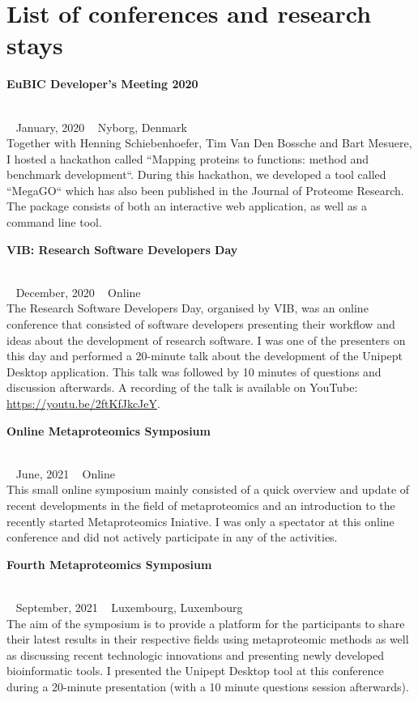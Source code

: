 \chapter*{List of conferences and research stays}

\begin{large}\textbf{\textsf{EuBIC Developer's Meeting 2020}}\end{large} \\
\faCalendar ~ \textsf{January, 2020} \hfill \faGlobe ~ \textsf{Nyborg, Denmark} \\
Together with Henning Schiebenhoefer, Tim Van Den Bossche and Bart Mesuere, I hosted a hackathon called ``Mapping proteins to functions: method and benchmark development``.
During this hackathon, we developed a tool called ``MegaGO`` which has also been published in the Journal of Proteome Research.
The package consists of both an interactive web application, as well as a command line tool.

\begin{large}\textbf{\textsf{VIB: Research Software Developers Day}}\end{large} \\
\faCalendar ~ \textsf{December, 2020} \hfill \faGlobe ~ \textsf{Online} \\
The Research Software Developers Day, organised by VIB, was an online conference that consisted of software developers presenting their workflow and ideas about the development of research software.
I was one of the presenters on this day and performed a 20-minute talk about the development of the Unipept Desktop application. This talk was followed by 10 minutes of questions and discussion afterwards.
A recording of the talk is available on YouTube: \href{https://youtu.be/2ftKfJkcJeY}{https://youtu.be/2ftKfJkcJeY}.

\begin{large}\textbf{\textsf{Online Metaproteomics Symposium}}\end{large} \\
\faCalendar ~ \textsf{June, 2021} \hfill \faGlobe ~ \textsf{Online} \\
This small online symposium mainly consisted of a quick overview and update of recent developments in the field of metaproteomics and an introduction to the recently started Metaproteomics Iniative.
I was only a spectator at this online conference and did not actively participate in any of the activities.

\begin{large}\textbf{\textsf{Fourth Metaproteomics Symposium}}\end{large} \\
\faCalendar ~ \textsf{September, 2021} \hfill \faGlobe ~ \textsf{Luxembourg, Luxembourg} \\
The aim of the symposium is to provide a platform for the participants to share their latest results in their respective fields using metaproteomic methods as well as discussing recent technologic innovations and presenting newly developed bioinformatic tools.
I presented the Unipept Desktop tool at this conference during a 20-minute presentation (with a 10 minute questions session afterwards).

